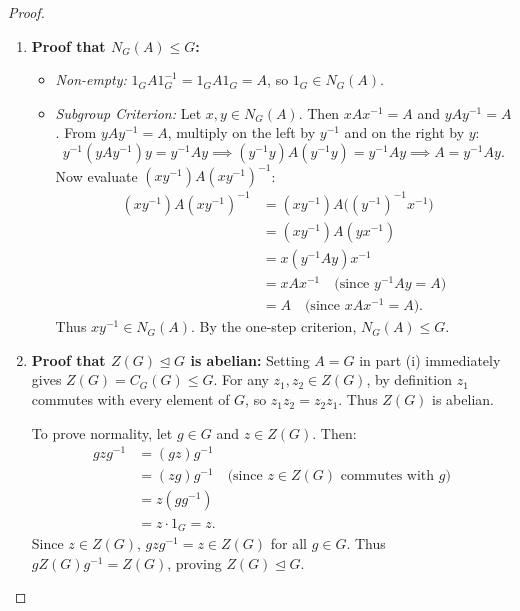 \begin{proof}
\begin{enumerate}[label=\textbf{(\roman*)}, leftmargin=*, itemsep=8pt]
    \item \textbf{Proof that $N_G(A) \le G$:}
    \begin{itemize}[leftmargin=1.5em, itemsep=4pt]
        \item \emph{Non-empty:} $1_G A 1_G^{-1} = 1_G A 1_G = A$, so $1_G \in N_G(A)$.
        \item \emph{Subgroup Criterion:} Let $x, y \in N_G(A)$. Then $xAx^{-1} = A$ and $yAy^{-1} = A$.
        From $yAy^{-1} = A$, multiply on the left by $y^{-1}$ and on the right by $y$:
        \begin{equation*}
        y^{-1}(yAy^{-1})y = y^{-1}Ay \implies (y^{-1}y)A(y^{-1}y) = y^{-1}Ay \implies A = y^{-1}Ay.
        \end{equation*}
        Now evaluate $(xy^{-1})A(xy^{-1})^{-1}$:
        \begin{align*}
        (xy^{-1})A(xy^{-1})^{-1} &= (xy^{-1})A\bigl((y^{-1})^{-1}x^{-1}\bigr) \\
        &= (xy^{-1})A(yx^{-1}) \\
        &= x(y^{-1}Ay)x^{-1} \\
        &= xAx^{-1} \quad \text{(since $y^{-1}Ay = A$)} \\
        &= A \quad \text{(since $xAx^{-1} = A$)}.
        \end{align*}
        Thus $xy^{-1} \in N_G(A)$. By the one-step criterion, $N_G(A) \le G$.
    \end{itemize}

    \item \textbf{Proof that $Z(G) \trianglelefteq G$ is abelian:}
    Setting $A = G$ in part (i) immediately gives $Z(G) = C_G(G) \le G$.
    For any $z_1, z_2 \in Z(G)$, by definition $z_1$ commutes with every element of $G$, so $z_1 z_2 = z_2 z_1$. Thus $Z(G)$ is abelian.
    
    To prove normality, let $g \in G$ and $z \in Z(G)$. Then:
    \begin{align*}
    gzg^{-1} &= (gz)g^{-1} \\
    &= (zg)g^{-1} \quad \text{(since $z \in Z(G)$ commutes with $g$)} \\
    &= z(gg^{-1}) \\
    &= z \cdot 1_G = z.
    \end{align*}
    Since $z \in Z(G)$, $gzg^{-1} = z \in Z(G)$ for all $g \in G$. Thus $g Z(G) g^{-1} = Z(G)$, proving $Z(G) \trianglelefteq G$.


\end{enumerate}
\end{proof}
